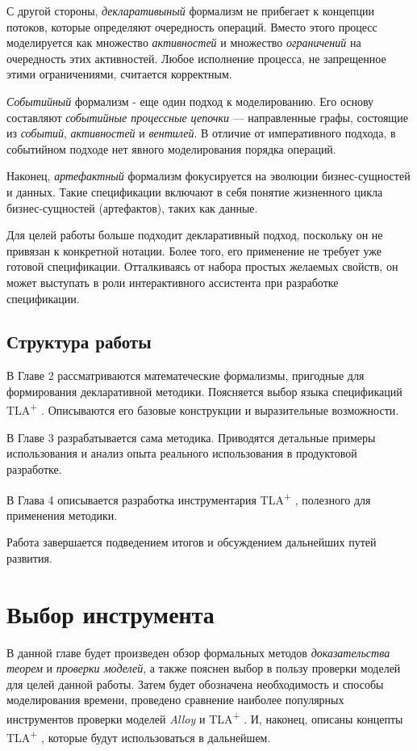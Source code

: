 \documentclass[14pt, openany]{report}
\newcommand{\tlapl}{TLA\textsuperscript{+} }
\begin{document}
С другой стороны, \emph{декларативыный} формализм не прибегает к концепции потоков, которые определяют очередность операций. Вместо этого процесс моделируется как множество \emph{активностей} и множество \emph{ограничений} на очередность этих активностей. Любое исполнение процесса, не запрещенное этими ограничениями, считается корректным.

\emph{Событийный} формализм \cite{specEDC} - еще один подход к моделированию. Его основу составляют \emph{событийные процессные цепочки} --- направленные графы, состоящие из \emph{событий}, \emph{активностей} и \emph{вентилей}. В отличие от императивного подхода, в событийном подходе нет явного моделирования порядка операций.

Наконец, \emph{артефактный} формализм фокусируется на эволюции бизнес-сущностей и данных. Такие спецификации включают в себя понятие жизненного цикла бизнес-сущностей (артефактов), таких как данные.

Для целей работы больше подходит декларативный подход, поскольку он не привязан к конкретной нотации. Более того, его применение не требует уже готовой спецификации. Отталкиваясь от набора простых желаемых свойств, он может выступать в роли интерактивного ассистента при разработке спецификации.


\section{Структура работы}

В Главе 2 рассматриваются математеческие формализмы, пригодные для формирования декларативной методики. Поясняется выбор языка спецификаций \tlapl. Описываются его базовые конструкции и выразительные возможности.

В Главе 3 разрабатывается сама методика. Приводятся детальные примеры использования и анализ опыта реального использования в продуктовой разработке. 

В Глава 4 описывается разработка инструментария \tlapl, полезного для применения методики.

Работа завершается подведением итогов и обсуждением дальнейших путей развития.

\chapter{Выбор инструмента}
В данной главе будет произведен обзор формальных методов \emph{доказательства теорем} и \emph{проверки моделей}, а также пояснен выбор в пользу проверки моделей для целей данной работы. Затем будет обозначена необходимость и способы моделирования времени, проведено сравнение наиболее популярных инструментов проверки моделей \emph{Alloy} и \tlapl. И, наконец, описаны концепты \tlapl, которые будут использоваться в дальнейшем.
\end{document}

